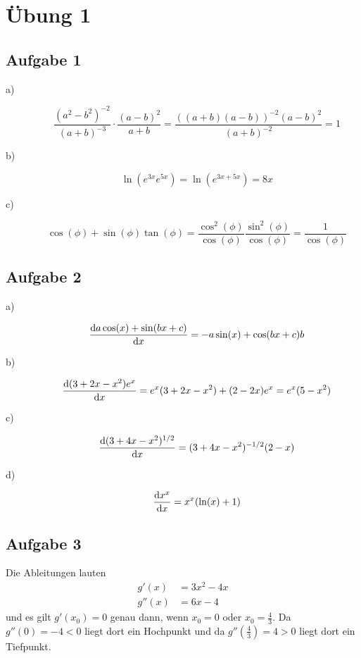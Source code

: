 \chapter{Übung 1}

\section*{Aufgabe 1}

\begin{description}
	\item[a)] 
	\[
		\frac{(a^2 - b^2)^{-2}}{(a + b)^{-3}} \cdot \frac{(a - b)^2}{a + b}
		= \frac{((a + b)(a - b))^{-2} (a - b)^2}{(a + b)^{-2}}
		= 1
	\] 
	
	\item[b)]
	\[
		\ln(e^{3x} e^{5x}) = \ln(e^{3x + 5x}) 
		= 8x
	\]
	
	\item[c)]
	\[
		\cos(\phi) + \sin(\phi) \tan(\phi) 
		= \frac{\cos^2(\phi)}{\cos(\phi)} \frac{\sin^2(\phi)}{\cos(\phi)}
		= \frac{1}{\cos(\phi)} 
	\]
\end{description}

\section*{Aufgabe 2}

\begin{description}
	\item[a)] 
	\[
		\frac{\mathrm{d}a \cos(x) + \sin(bx + c)}{\mathrm{d}x} = - a \sin(x) + \cos(bx + c) b
	\] 
	
	\item[b)]
	\[
		\frac{\mathrm{d}(3 + 2x - x^2)e^x}{\mathrm{d}x} = e^x (3 + 2x - x^2) + (2 - 2x)e^x = e^x (5 - x^2)
	\]
	
	\item[c)]
	\[
		\frac{\mathrm{d}(3 + 4x - x^2)^{1/2}}{\mathrm{d}x} = (3 + 4x - x^2)^{-1/2} (2 - x)
	\]
	
	\item[d)]
	\[
		\frac{\mathrm{d}x^x}{\mathrm{d}x} = x^x (\ln(x) + 1)
	\]
\end{description}

\section*{Aufgabe 3}
Die Ableitungen lauten
\begin{align*}
	g'(x) &= 3x^2 - 4x \\	
	g''(x) &= 6x - 4
\end{align*}
und es gilt $g'(x_0) = 0$ genau dann, wenn $x_0 = 0$ oder $x_0 = \frac{4}{3}$. Da $g''(0) = -4 < 0$ liegt dort ein Hochpunkt und da $g''(\frac{4}{3}) = 4 > 0$ liegt dort ein Tiefpunkt.

